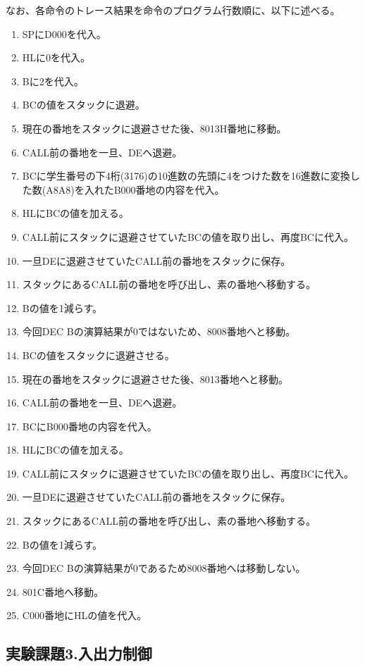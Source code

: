 \documentclass[11pt,a4j]{jsarticle}
\begin{document}
   なお、各命令のトレース結果を命令のプログラム行数順に、以下に述べる。
   \begin{enumerate}
   \item SPにD000を代入。
   \item HLに0を代入。
   \item Bに2を代入。 
   \item BCの値をスタックに退避。
   \item 現在の番地をスタックに退避させた後、8013H番地に移動。 
   \item CALL前の番地を一旦、DEへ退避。
   \item BCに学生番号の下4桁(3176)の10進数の先頭に4をつけた数を16進数に変換した数(A8A8)を入れたB000番地の内容を代入。
   \item HLにBCの値を加える。
   \item CALL前にスタックに退避させていたBCの値を取り出し、再度BCに代入。
   \item 一旦DEに退避させていたCALL前の番地をスタックに保存。
   \item スタックにあるCALL前の番地を呼び出し、素の番地へ移動する。
   \item Bの値を1減らす。
   \item 今回DEC Bの演算結果が0ではないため、8008番地へと移動。
   \item BCの値をスタックに退避させる。
   \item 現在の番地をスタックに退避させた後、8013番地へと移動。
   \item CALL前の番地を一旦、DEへ退避。
   \item BCにB000番地の内容を代入。
   \item HLにBCの値を加える。
   \item CALL前にスタックに退避させていたBCの値を取り出し、再度BCに代入。
   \item 一旦DEに退避させていたCALL前の番地をスタックに保存。
   \item スタックにあるCALL前の番地を呼び出し、素の番地へ移動する。
   \item Bの値を1減らす。
   \item 今回DEC Bの演算結果が0であるため8008番地へは移動しない。
   \item 801C番地へ移動。
   \item C000番地にHLの値を代入。
   \end{enumerate}
   
  
  \subsection{実験課題3.入出力制御}
  
\end{document}
